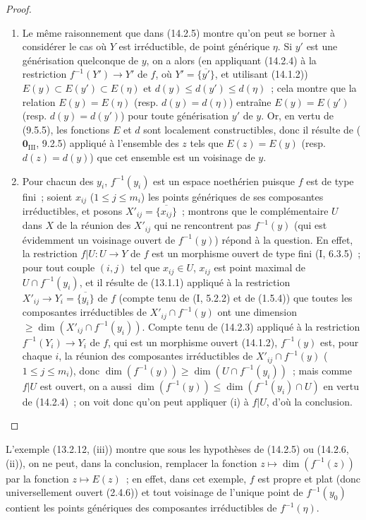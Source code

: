 \begin{proof}
\begin{enumerate}[label=(\roman*)]
  \item Le même raisonnement que dans (14.2.5) montre qu'on peut se borner à
  considérer le cas où $Y$ est irréductible, de point générique $\eta$. Si $y'$
  est une générisation quelconque de $y$, on a alors (en appliquant (14.2.4) à la
  restriction $f^{-1}(Y')\to Y'$ de $f$, où $Y'=\overline{\{y'\}}$, et utilisant
  (14.1.2)) $E(y)\subset E(y')\subset E(\eta)$ et
  $d(y)\leq d(y')\leq d(\eta)$~; cela montre que la relation $E(y)=E(\eta)$
  (resp. $d(y)=d(\eta)$) entraîne $E(y)=E(y')$ (resp. $d(y)=d(y')$) pour toute
  générisation $y'$ de $y$. Or, en vertu de (9.5.5), les fonctions $E$ et $d$ sont
  localement constructibles, donc il résulte de ($\mathbf{0}_{\mathrm{III}}$,
  9.2.5) appliqué à l'ensemble des $z$ tels que $E(z)=E(y)$ (resp.
  $d(z)=d(y)$) que cet ensemble est un voisinage de $y$.

  \item Pour chacun des $y_i$, $f^{-1}(y_i)$ est un espace noethérien puisque $f$
  est de type fini~; soient $x_{ij}$ ($1\leq j\leq m_i$) les points génériques de
  ses composantes irréductibles, et posons $X'_{ij}=\overline{\{x_{ij}\}}$~;
  montrons que le complémentaire $U$ dans $X$ de la réunion des $X'_{ij}$ qui ne
  rencontrent pas $f^{-1}(y)$ (qui est évidemment un voisinage ouvert de
  $f^{-1}(y)$) répond à la question. En effet, la restriction $f|U:U\to Y$ de $f$
  est un morphisme ouvert de type fini (I, 6.3.5)~; pour tout couple $(i,j)$ tel
  que $x_{ij}\in U$, $x_{ij}$ est point maximal de $U\cap f^{-1}(y_i)$, et il
  résulte de (13.1.1) appliqué à la restriction
  $X'_{ij}\to Y_i=\overline{\{y_i\}}$ de $f$ (compte tenu de (I, 5.2.2) et de
  (1.5.4)) que toutes les composantes irréductibles de
  $X'_{ij}\cap f^{-1}(y)$ ont une dimension
  $\geq\dim(X'_{ij}\cap f^{-1}(y_i))$. Compte tenu de (14.2.3) appliqué à la
  restriction $f^{-1}(Y_i)\to Y_i$ de $f$, qui est un morphisme ouvert (14.1.2),
  $f^{-1}(y)$ est, pour chaque $i$, la réunion des composantes irréductibles de
  $X'_{ij}\cap f^{-1}(y)$ ($1\leq j\leq m_i$), donc
  $\dim(f^{-1}(y))\geq\dim(U\cap f^{-1}(y_i))$~; mais comme $f|U$ est ouvert, on a
  aussi $\dim(f^{-1}(y))\leq\dim(f^{-1}(y_i)\cap U)$ en vertu de (14.2.4)~; on voit
  donc qu'on peut appliquer (i) à $f|U$, d'où la conclusion.
\end{enumerate}
\end{proof}

\begin{remark}[14.2.7]
\label{IV.14.2.7-fr}
L'exemple (13.2.12, (iii)) montre que sous les hypothèses de (14.2.5) ou
(14.2.6, (ii)), on ne peut, dans la conclusion, remplacer la fonction
$z\mapsto\dim(f^{-1}(z))$ par la fonction $z\mapsto E(z)$~; en effet, dans cet
exemple, $f$ est propre et plat (donc universellement ouvert (2.4.6)) et tout
voisinage de l'unique point de $f^{-1}(y_0)$ contient les points génériques des
composantes irréductibles de $f^{-1}(\eta)$.
\end{remark}

